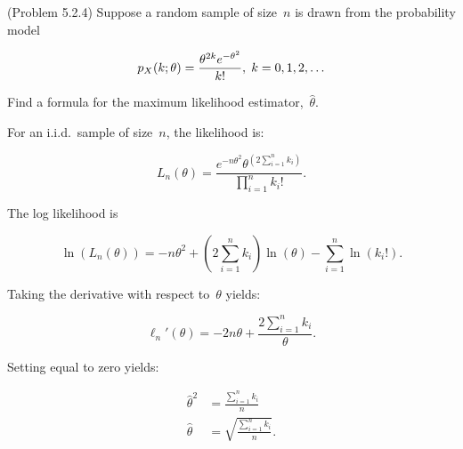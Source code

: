 \begin{problem}
  (\textnormal{Problem 5.2.4}) Suppose a random sample of size~$n$ is drawn from the probability model

  \begin{equation}\label{eq:P03:Distr}
    p_{X}(k;\theta) = \frac{\theta^{2k} e^{-\theta^2}}{k!}, \hspace{0.1cm}k=0,1,2,\ldots
  \end{equation}

  \noindent
  Find a formula for the maximum likelihood estimator,~$\hat{\theta}$.
\end{problem}

For an i.i.d.\ sample of size~$n$, the likelihood is:

\begin{equation}\label{eq:P03:Likelihood}
  L_{n}(\theta) = \frac{e^{-n\theta^{2}} \theta^{\left(2\sum_{i=1}^{n} k_i\right)}}{\prod_{i=1}^{n} k_i !}\text{.}
\end{equation}

\noindent
The log likelihood is

\begin{equation}\label{eq:P03:LogLikelihood}
  \ln\left(L_{n}(\theta)\right) = -n\theta^{2} + {\left(2\sum_{i=1}^{n} k_i\right)} \ln\left(\theta\right) - \sum_{i=1}^{n} \ln\left(k_{i}!\right) \text{.}
\end{equation}

\noindent
Taking the derivative with respect to~$\theta$ yields:

\begin{equation}\label{eq:P03:LogLikelihood:Deriv}
  \ell_{n}'(\theta) = -2n\theta + \frac{2\sum_{i=1}^{n} k_i}{\theta}\text{.}
\end{equation}

\noindent
Setting equal to zero yields:

\begin{align}
  \hat{\theta}^{2} &= \frac{\sum_{i=1}^{n} k_i}{n} \\
  \hat{\theta} &= \boxed{\sqrt{\frac{\sum_{i=1}^{n} k_i}{n}}} \text{.}
\end{align}
